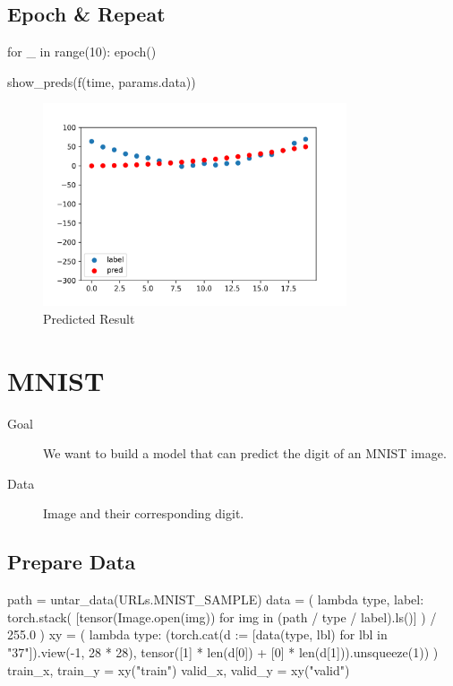 \documentclass{article}
\newenvironment{monos}{\VerbatimEnvironment\begin{pythoncode}}{\end{pythoncode}}
\begin{document}
\subsection{Epoch \& Repeat}

\begin{monos}
for _ in range(10):
    epoch()

show_preds(f(time, params.data))
\end{monos}

\begin{figure}[H]
    \centering
    \includegraphics[width=0.8\textwidth]{assets/model.png}
    \caption{Predicted Result}
\end{figure}

\section{MNIST}

\begin{description}
    \item[Goal] We want to build a model that can predict the digit of an MNIST image.
    \item[Data] Image and their corresponding digit.
\end{description}

\subsection{Prepare Data}

\begin{monos}
path = untar_data(URLs.MNIST_SAMPLE)
data = (
    lambda type, label: torch.stack(
        [tensor(Image.open(img)) for img in (path / type / label).ls()]
    )
    / 255.0
)
xy = (
    lambda type: (torch.cat(d := [data(type, lbl) for lbl in "37"]).view(-1, 28 * 28),
    tensor([1] * len(d[0]) + [0] * len(d[1])).unsqueeze(1))
)
train_x, train_y = xy("train")
valid_x, valid_y = xy("valid")
\end{monos}
\end{document}
